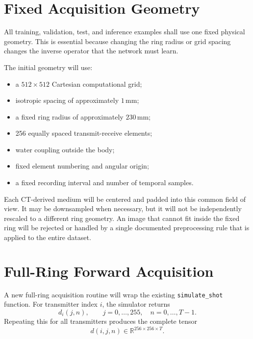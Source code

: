 \documentclass[11pt]{article}
\begin{document}
\section{Fixed Acquisition Geometry}

All training, validation, test, and inference examples shall use one fixed
physical geometry. This is essential because changing the ring radius or grid
spacing changes the inverse operator that the network must learn.

The initial geometry will use:
\begin{itemize}
  \item a $512\times512$ Cartesian computational grid;
  \item isotropic spacing of approximately $1\,\mathrm{mm}$;
  \item a fixed ring radius of approximately $230\,\mathrm{mm}$;
  \item 256 equally spaced transmit-receive elements;
  \item water coupling outside the body;
  \item fixed element numbering and angular origin;
  \item a fixed recording interval and number of temporal samples.
\end{itemize}

Each CT-derived medium will be centered and padded into this common field of
view. It may be downsampled when necessary, but it will not be independently
rescaled to a different ring geometry. An image that cannot fit inside the
fixed ring will be rejected or handled by a single documented preprocessing
rule that is applied to the entire dataset.

\section{Full-Ring Forward Acquisition}

A new full-ring acquisition routine will wrap the existing
\texttt{simulate\_shot} function. For transmitter index $i$, the simulator
returns
\begin{equation}
  d_i(j,n),\qquad j=0,\ldots,255,
  \quad n=0,\ldots,T-1.
\end{equation}
Repeating this for all transmitters produces the complete tensor
\begin{equation}
  d(i,j,n)\in\mathbb{R}^{256\times256\times T}.
\end{equation}
\end{document}

